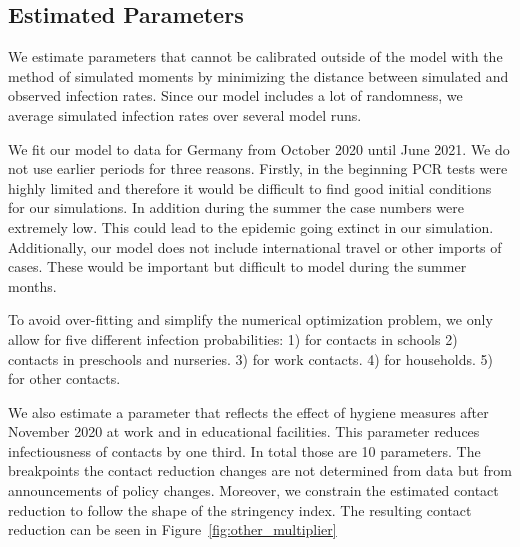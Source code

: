 \subsection{Estimated Parameters}
\label{subsec:estimated_params}


\FloatBarrier

We estimate parameters that cannot be calibrated outside of the model with the
method of simulated moments \citep{McFadden1989} by minimizing the distance between
simulated and observed infection rates. Since our model includes a lot of randomness, we
average simulated infection rates over several model runs.

We fit our model to data for Germany from October 2020 until June 2021. We do not use
earlier periods for three reasons. Firstly, in the beginning PCR tests were highly
limited and therefore it would be difficult to find good initial conditions for our
simulations. In addition during the summer the case numbers were extremely low. This
could lead to the epidemic going extinct in our simulation. Additionally, our model does
not include international travel or other imports of cases. These would be important but
difficult to model during the summer months.


To avoid over-fitting and simplify the numerical optimization problem, we only allow for
five different infection probabilities: 1) for contacts in schools 2) contacts in
preschools and nurseries. 3) for work contacts. 4) for households. 5) for other
contacts.

We also estimate a parameter that reflects the effect of hygiene measures
after November 2020 at work and in educational facilities. This parameter reduces
infectiousness of contacts by one third. In total those are 10 parameters. The
breakpoints the contact reduction changes are not determined from data but from
announcements of policy changes. Moreover, we constrain the estimated contact reduction
to follow the shape of the stringency index. The resulting contact reduction can be
seen in Figure~\ref{fig:other_multiplier}


